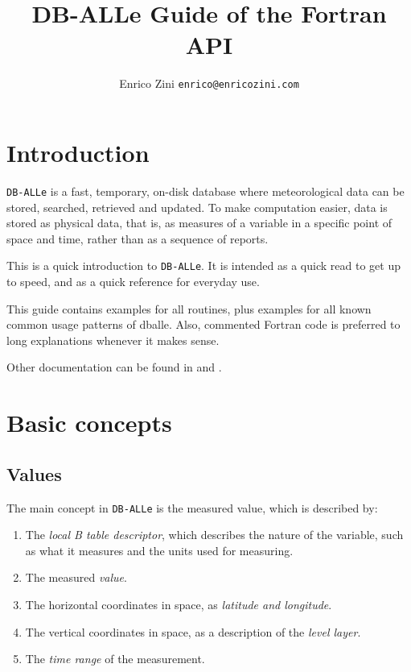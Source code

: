 \documentclass[draft,12pt,a4paper,twoside]{book}
\title{DB-ALLe Guide of the Fortran API}
\author{Enrico Zini \hfil {\tt enrico@enricozini.com}}
\newcommand{\dballe}{{\tt DB-ALLe}}
\begin{document}


\maketitle


\tableofcontents

\chapter {Introduction}
\label{ch-intro}

\dballe{} is a fast, temporary, on-disk database where meteorological data can
be stored, searched, retrieved and updated.  To make computation easier, data
is stored as physical data, that is, as measures of a variable in a specific
point of space and time, rather than as a sequence of reports.

This is a quick introduction to \dballe{}.  It is intended as a quick read to
get up to speed, and as a quick reference for everyday use.


This guide contains examples for all routines, plus examples for all known
common usage patterns of dballe.  Also, commented Fortran code is preferred
to long explanations whenever it makes sense.

Other documentation can be found in \cite{UserGuide} and \cite{LibDoc}.

\chapter {Basic concepts}
\label{ch-concepts}

\section {Values}

The main concept in \dballe{} is the measured value, which is described by:

\begin{enumerate}
\item The \emph{local B table descriptor}, which describes the nature of the
      variable, such as what it measures and the units used for measuring.
\item The measured \emph{value}.
\item The horizontal coordinates in space, as \emph{latitude and longitude}.
\item The vertical coordinates in space, as a description of the \emph{level layer}.
\item The \emph{time range} of the measurement.
\end{enumerate}
\end{document}
